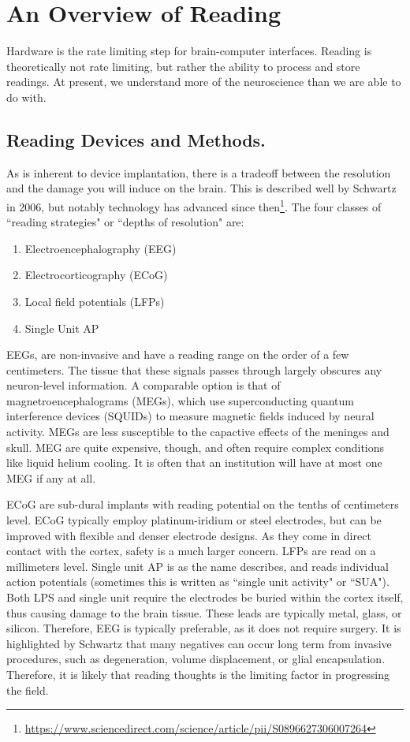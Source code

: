 \section{An Overview of Reading} 

Hardware is the rate limiting step for brain-computer interfaces. Reading is theoretically not rate limiting, but rather the ability to process and store readings. At present, we understand more of the neuroscience than we are able to do with. 

\subsection{Reading Devices and Methods.}

As is inherent to device implantation, there is a tradeoff between the resolution and the damage you will induce on the brain. This is described well by Schwartz in 2006, but notably technology has advanced since then\footnote{\url{https://www.sciencedirect.com/science/article/pii/S0896627306007264}}. The four classes of ``reading strategies" or ``depths of resolution" are: 
\begin{enumerate}
    \itemsep 0em
    \item Electroencephalography (EEG)
    \item Electrocorticography (ECoG)
    \item Local field potentials (LFPs)
    \item Single Unit AP
\end{enumerate}

EEGs, are non-invasive and have a reading range on the order of a few centimeters. The tissue that these signals passes through largely obscures any neuron-level information. A comparable option is that of magnetroencephalograms (MEGs), which use superconducting quantum interference devices (SQUIDs) to measure magnetic fields induced by neural activity. MEGs are less susceptible to the capactive effects of the meninges and skull. MEG are quite expensive, though, and often require complex conditions like liquid helium cooling. It is often that an institution will have at most one MEG if any at all.\newline

ECoG are sub-dural implants with reading potential on the tenths of centimeters level. ECoG typically employ platinum-iridium or steel electrodes, but can be improved with flexible and denser electrode designs. As they come in direct contact with the cortex, safety is a much larger concern. LFPs are read on a millimeters level. Single unit AP is as the name describes, and reads individual action potentials (sometimes this is written as ``single unit activity" or ``SUA"). Both LPS and single unit require the electrodes be buried within the cortex itself, thus causing damage to the brain tissue. These leads are typically metal, glass, or silicon. Therefore, EEG is typically preferable, as it does not require surgery. It is highlighted by Schwartz that many negatives can occur long term from invasive procedures, such as degeneration, volume displacement, or glial encapsulation. Therefore, it is likely that reading thoughts is the limiting factor in progressing the field. \newline

